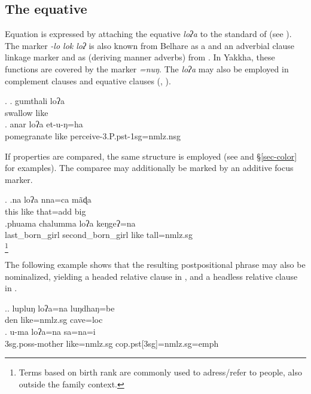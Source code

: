 \subsection{The equative}\label{sec-equ}

Equation is expressed by attaching the equative  \emph{loʔa}  to the standard of  (see \Next). The marker \emph{-lo \ti lok \ti loʔ} is also known from Belhare as a  and an adverbial clause linkage marker \citep{Bickel1993Belhare} and as  (deriving manner adverbs) from   \citep[299]{Doornenbal2009A-grammar}. In Yakkha, these functions are covered by the  marker \emph{=nuŋ}. The  \emph{loʔa}  may also be employed in complement clauses and equative clauses (, ). 

 \ex. \ag. gumthali loʔa\\ 
 swallow like\\
  \bg. anar loʔa et-u-ŋ=ha\\ 
  pomegranate like perceive-{\sc 3.P.pst-1sg=nmlz.nsg}\\
   
  
If properties are compared, the same structure is employed (see \Next and §\ref{sec-color} for examples). The comparee may additionally be marked by an additive focus marker.
  
  \ex. \ag.na loʔa nna=ca mãɖa\\
this like that{\sc =add} big\\
  \bg.phuama chalumma loʔa keŋgeʔ=na\\
  last\_born\_girl  second\_born\_girl  like tall{\sc =nmlz.sg}\\
  \footnote{Terms based on birth rank are commonly used to adress/refer to people, also outside the family context.}

 The following example shows that the resulting postpositional phrase may also be nominalized, yielding a headed relative clause in \Next[a], and a headless relative clause in \Next[b]. 
 
  \ex.\ag. lupluŋ loʔa=na       luŋdhaŋ=be\\
  den like{\sc =nmlz.sg} cave{\sc =loc}\\
   
\bg.  u-ma              loʔa=na        sa=na=i\\
{\sc 3sg.poss-}mother like{\sc =nmlz.sg} {\sc cop.pst[3sg]=nmlz.sg=emph}\\
 

